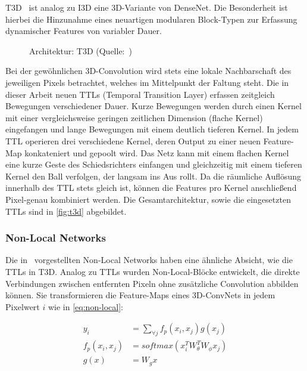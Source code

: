 T3D~\cite{Diba17} ist analog zu I3D eine 3D-Variante von DenseNet.
Die Besonderheit ist hierbei die Hinzunahme eines neuartigen modularen Block-Typen zur Erfassung dynamischer Features von variabler Dauer.

\begin{figure}[h!]
    \centering
    \caption{Architektur: T3D (Quelle:~\cite{Diba17})}
    \label{fig:t3d}
\end{figure}

Bei der gewöhnlichen 3D-Convolution wird stets eine lokale Nachbarschaft des jeweiligen Pixels betrachtet, welches im Mittelpunkt der Faltung steht.
Die in dieser Arbeit neuen TTLs (Temporal Transition Layer) erfassen zeitgleich Bewegungen verschiedener Dauer.
Kurze Bewegungen werden durch einen Kernel mit einer vergleichsweise geringen zeitlichen Dimension (flache Kernel) eingefangen und lange Bewegungen mit einem deutlich tieferen Kernel.
In jedem TTL operieren drei verschiedene Kernel, deren Output zu einer neuen Feature-Map konkateniert und gepoolt wird.
Das Netz kann mit einem flachen Kernel \zB eine kurze Geste des Schiedsrichters einfangen und gleichzeitig mit einem tieferen Kernel den Ball verfolgen, der langsam ins Aus rollt.
Da die räumliche Auflösung innerhalb des TTL stets gleich ist, können die Features pro Kernel anschließend Pixel-genau kombiniert werden.
Die Gesamtarchitektur, sowie die eingesetzten TTLs sind in \autoref{fig:t3d} abgebildet.

\subsubsection*{Non-Local Networks}

Die in~\cite{Wang18} vorgestellten Non-Local Networks haben eine ähnliche Absicht, wie die TTLs in T3D.
Analog zu TTLs wurden Non-Local-Blöcke entwickelt, die direkte Verbindungen zwischen entfernten Pixeln ohne zusätzliche Convolution abbilden können.
Sie transformieren die Feature-Maps eines 3D-ConvNets in jedem Pixelwert $i$ wie in \autoref{eq:non-local}:

\begin{equation}
\label{eq:non-local}
\begin{split}
    y_i             & = \sum_{\forall j} f_p(x_i, x_j) g(x_j) \\
    f_p(x_i, x_j)   & = softmax(x_i^T W^T_\theta W_\phi x_j) \\
    g(x)            & = W_g x
\end{split}
\end{equation}

